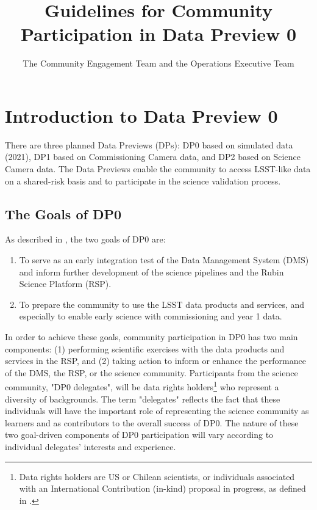 \documentclass[DM,lsstdraft,authoryear,toc]{lsstdoc}
\title{Guidelines for Community Participation in Data Preview 0}
\author{The Community Engagement Team and the Operations Executive Team}
\date{\vcsDate}
\begin{document}
\maketitle

\renewcommand{\thepage}{\arabic{page}}%

\setcounter{page}{1}%


\section{Introduction to Data Preview 0}\label{sec:intro}

There are three planned Data Previews (DPs): DP0 based on simulated data (2021), DP1 based on Commissioning Camera data, and DP2 based on Science Camera data.
The Data Previews enable the community to access LSST-like data on a shared-risk basis and to participate in the science validation process. 

\subsection{The Goals of DP0}\label{ssec:intro_goals}

As described in , the two goals of DP0 are:
\begin{enumerate}
\item To serve as an early integration test of the Data Management System (DMS) and inform further development of the science pipelines and the Rubin Science Platform (RSP).
\item To prepare the community to use the LSST data products and services, and especially to enable early science with commissioning and year 1 data.
\end{enumerate}

In order to achieve these goals, community participation in DP0 has two main components:
(1) performing scientific exercises with the data products and services in the RSP, and
(2) taking action to inform or enhance the performance of the DMS, the RSP, or the science community.
Participants from the science community, "DP0 delegates", will be data rights holders\footnote{Data rights holders are US or Chilean scientists, or individuals associated with an International Contribution (in-kind) proposal in progress, as defined in .} who represent a diversity of backgrounds.
The term "delegates" reflects the fact that these individuals will have the important role of representing the science community as learners and as contributors to the overall success of DP0.
The nature of these two goal-driven components of DP0 participation will vary according to individual delegates' interests and experience.
\end{document}
